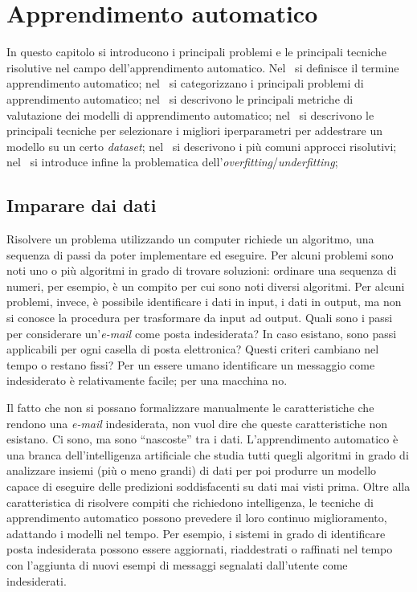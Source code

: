 \chapter{Apprendimento automatico}\label{chap:AI_ML}
In questo capitolo si introducono i principali problemi e le principali tecniche risolutive nel campo dell'apprendimento automatico.
Nel~ si definisce il termine apprendimento automatico; nel~ si categorizzano i principali problemi di apprendimento automatico; nel~ si descrivono le principali metriche di valutazione dei modelli di apprendimento automatico; nel~ si descrivono le principali tecniche per selezionare i migliori iperparametri per addestrare un modello su un certo \emph{dataset}; nel~ si descrivono i più comuni approcci risolutivi; nel~ si introduce infine la problematica dell'\emph{overfitting}/\emph{underfitting}; 

\section{Imparare dai dati}\label{sec:imparare_dai_dati}
Risolvere un problema utilizzando un computer richiede un algoritmo, una sequenza di passi da poter implementare ed eseguire. 
Per alcuni problemi sono noti uno o più algoritmi in grado di trovare soluzioni: ordinare una sequenza di numeri, per esempio, è un compito per cui sono noti diversi algoritmi. 
Per alcuni problemi, invece, è possibile identificare i dati in input, i dati in output, ma non si conosce la procedura per trasformare da input ad output. 
Quali sono i passi per considerare un'\textit{e-mail} come posta indesiderata? 
In caso esistano, sono passi applicabili per ogni casella di posta elettronica? 
Questi criteri cambiano nel tempo o restano fissi? 
Per un essere umano identificare un messaggio come indesiderato è relativamente facile; per una macchina no.

Il fatto che non si possano formalizzare manualmente le caratteristiche che rendono una \emph{e-mail} indesiderata, non vuol dire che queste caratteristiche non esistano. 
Ci sono, ma sono ``nascoste'' tra i dati.
L'apprendimento automatico è una branca dell'intelligenza artificiale che studia tutti quegli algoritmi in grado di analizzare insiemi (più o meno grandi) di dati per poi produrre un modello capace di eseguire delle predizioni soddisfacenti su dati mai visti prima. 
Oltre alla caratteristica di risolvere compiti che richiedono intelligenza, le tecniche di apprendimento automatico possono prevedere il loro continuo miglioramento, adattando i modelli nel tempo.
Per esempio, i sistemi in grado di identificare posta indesiderata possono essere aggiornati, riaddestrati o raffinati nel tempo con l'aggiunta di nuovi esempi di messaggi segnalati dall'utente come indesiderati.

